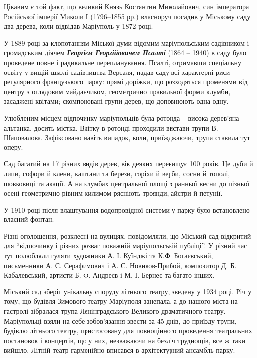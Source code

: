 
Цікавим є той факт, що великий Князь Костянтин Миколайович, син імператора
Російської імперії Миколи I (1796–1855 рр.) власноруч посадив у Міському саду
два дерева, коли відвідав Маріуполь у 1872 році.

У 1889 році за клопотанням Міської думи відомим маріупольським садівником і
громадським діячем \textbf{\emph{Георгієм Георгійовичем Псалті}} (1864 – 1940) в саду було
проведене повне і радикальне перепланування. Псалті, отримавши спеціальну
освіту у вищій школі садівництва Версаля, надав саду всі характерні риси
регулярного французького парку: прямі доріжки, що розходяться променями від
центру з оглядовим майданчиком, геометрично правильної форми клумби, засаджені
квітами; скомпоновані групи дерев, що доповнюють одна одну.


Улюбленим місцем відпочинку маріупольців була ротонда – висока дерев'яна
альтанка, досить містка. Влітку в ротонді проходили вистави трупи В.
Шаповалова. Зафіксовано навіть випадок, коли, приїжджаючи, трупа ставила тут
оперу.


Сад багатий на 17 різних видів дерев, вік деяких перевищує 100 років. Це дуби
й липи, софори й клени, каштани та берези, горіхи й верби, сосни й тополі,
шовковиці та акації. А на клумбах центральної площі з ранньої весни до пізньої
осені геометрично рівним килимом рясніють троянди, айстри й петунії.

У 1910 році після влаштування водопровідної системи у парку було встановлено
власний фонтан.


Різні оголошення, розклеєні на вулицях, повідомляли, що Міський сад відкритий
для \enquote{відпочинку і різних розваг поважній маріупольській публіці}. У
різний час тут полюбляли гуляти художники А. І. Куїнджі та К.Ф. Богаєвський,
письменники А. С. Серафимович і А. С. Новиков-Прибой, композитор Д. Б.
Кабалевський, артисти Б. Ф. Андреєв і М. І. Бернес та багато інших.


Міський сад зберіг унікальну споруду літнього театру, зведену у 1934 році. Річ
у тому, що будівля Зимового театру Маріуполя занепала, а до нашого міста на
гастролі зібралася трупа Ленінградського Великого драматичного театру.
Маріупольці взяли на себе зобов'язання звести за 45 днів, до приїзду трупи,
будівлю літнього театру, пристосовану для повноцінного проведення театральних
постановок і концертів, що у них, незважаючи на безліч труднощів, все ж таки
вийшло. Літній театр гармонійно вписався в архітектурний ансамбль парку.

